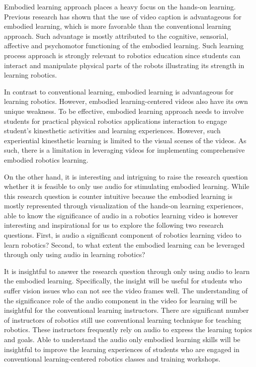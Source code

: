 \documentclass[fleqn,10pt]{JLA_article} %
\begin{document}
Embodied learning approach places a heavy focus on the hands-on learning. Previous research has shown that the use of video caption is advantageous for embodied learning, which is more favorable than the conventional learning approach. Such advantage is mostly attributed to the cognitive, sensorial, affective and psychomotor functioning of the embodied learning. Such learning process approach is strongly relevant to robotics education since students can interact and manipulate physical parts of the robots illustrating its strength in learning robotics.

In contrast to conventional learning, embodied learning is advantageous for learning robotics. However, embodied learning-centered videos also have its own unique weakness. To be effective, embodied learning approach needs to involve students for practical physical robotics applications interaction to engage student's kinesthetic activities and learning experiences. However, such experiential kinesthetic learning is limited to the visual scenes of the videos. As such, there is a limitation in leveraging videos for implementing comprehensive embodied robotics learning.

On the other hand, it is interesting and intriguing to raise the research question whether it is feasible to only use audio for stimulating embodied learning. While this research question is counter intuitive because the embodied learning is mostly represented through visualization of the hands-on learning experiences, able to know the significance of audio in a robotics learning video is however interesting and inspirational for us to explore the following two research questions. First, is audio a significant component of robotics learning video to learn robotics? Second, to what extent the embodied learning can be leveraged through only using audio in learning robotics?

It is insightful to answer the research question through only using audio to learn the embodied learning. Specifically, the insight will be useful for students who suffer vision issues who can not see the video frames well. The understanding of the significance role of the audio component in the video for learning will be insightful for the conventional learning instructors. There are significant number of instructors of robotics still use conventional learning technique for teaching robotics. These instructors frequently rely on audio to express the learning topics and goals. Able to understand the audio only embodied learning skills will be insightful to improve the learning experiences of students who are engaged in conventional learning-centered robotics classes and training workshops.
\end{document}
